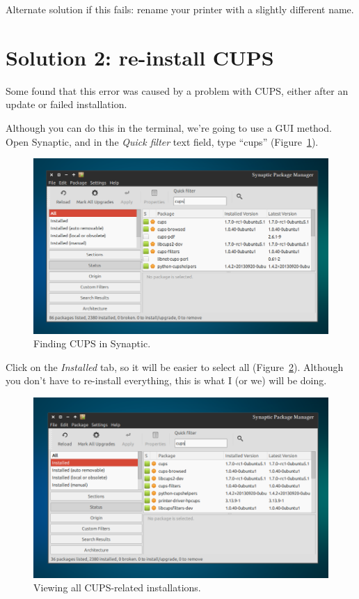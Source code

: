 \documentclass[12pt, a4paper]{article}
\begin{document}
\noindent Alternate solution if this fails: rename your printer with a slightly different name.

\section*{Solution 2: re-install CUPS}

Some found that this error was caused by a problem with CUPS, either after an update or failed installation.

Although you can do this in the terminal, we're going to use a GUI method. Open Synaptic, and in the \emph{Quick filter} text field, type “cups” (Figure~\ref{fig6}).

\newpage
\begin{figure}[!hbp]
  \centering
  \includegraphics[width=1\textwidth]{imgs/Filter_failed_6.png}
  \caption{Finding CUPS in Synaptic.}
  \label{fig6}
\end{figure}

\noindent Click on the \emph{Installed} tab, so it will be easier to select all (Figure~\ref{fig7}). Although you don't have to re-install everything, this is what I (or we) will be doing. 

\begin{figure}[!hbp]
  \centering
  \includegraphics[width=1\textwidth]{imgs/Filter_failed_7.png}
  \caption{Viewing all CUPS-related installations.}
  \label{fig7}
\end{figure}
\end{document}
